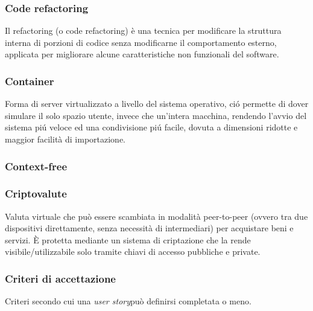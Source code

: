 \subsubsection*{Code refactoring}
Il refactoring (o code refactoring) è una tecnica per modificare la struttura interna di porzioni di codice senza modificarne il comportamento esterno, applicata per migliorare alcune caratteristiche non funzionali del software.
\subsubsection*{Container}
Forma di server virtualizzato a livello del sistema operativo, ció permette di dover simulare il solo spazio utente, invece che un’intera macchina, rendendo l’avvio del sistema piú veloce ed una condivisione piú facile, dovuta a dimensioni ridotte e maggior facilità di importazione.
\subsubsection*{Context-free}

\subsubsection*{Criptovalute}
Valuta virtuale che può essere scambiata in modalità peer-to-peer (ovvero tra due dispositivi direttamente, senza necessità di intermediari) per acquistare beni e servizi. È protetta mediante un sistema di criptazione che la rende visibile/utilizzabile solo tramite chiavi di accesso pubbliche e private.
\subsubsection*{Criteri di accettazione}
Criteri secondo cui una \textit{user story}\glo può definirsi completata o meno.

